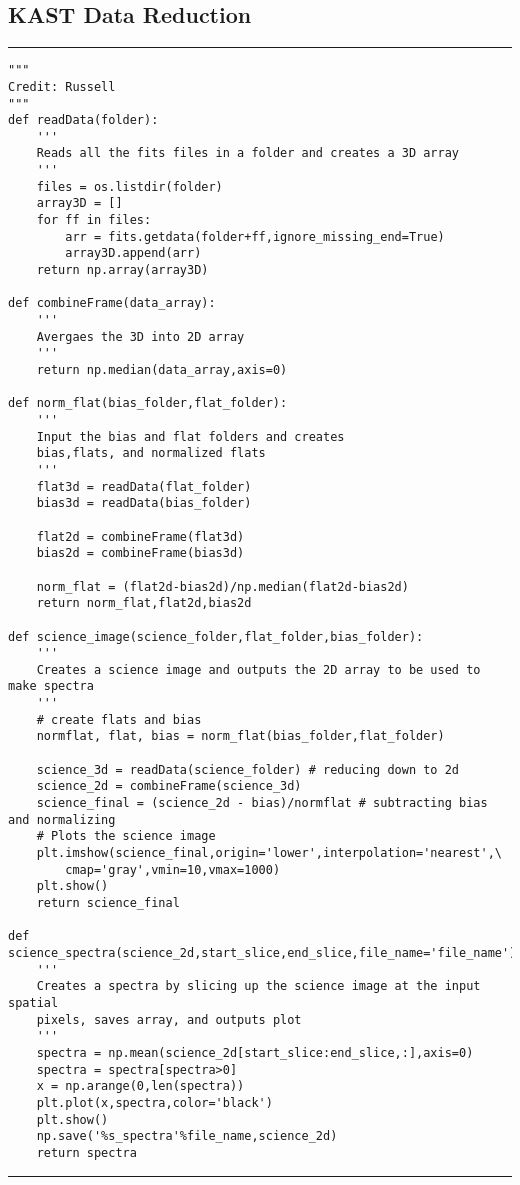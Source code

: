 \documentclass[preprint]{aastex62}
\begin{document}
\subsection{KAST Data Reduction} \label{code:reduction}
\small
\hrule
\begin{lstlisting}
"""
Credit: Russell
"""
def readData(folder):
    '''
    Reads all the fits files in a folder and creates a 3D array
    '''
    files = os.listdir(folder)
    array3D = []
    for ff in files:
        arr = fits.getdata(folder+ff,ignore_missing_end=True)
        array3D.append(arr)
    return np.array(array3D)

def combineFrame(data_array):
    '''
    Avergaes the 3D into 2D array
    '''
    return np.median(data_array,axis=0)
    
def norm_flat(bias_folder,flat_folder):
    '''
    Input the bias and flat folders and creates
    bias,flats, and normalized flats
    '''
    flat3d = readData(flat_folder)
    bias3d = readData(bias_folder)

    flat2d = combineFrame(flat3d)
    bias2d = combineFrame(bias3d)

    norm_flat = (flat2d-bias2d)/np.median(flat2d-bias2d)
    return norm_flat,flat2d,bias2d

def science_image(science_folder,flat_folder,bias_folder):
    '''
    Creates a science image and outputs the 2D array to be used to make spectra
    '''
    # create flats and bias
    normflat, flat, bias = norm_flat(bias_folder,flat_folder) 

    science_3d = readData(science_folder) # reducing down to 2d 
    science_2d = combineFrame(science_3d)
    science_final = (science_2d - bias)/normflat # subtracting bias and normalizing
    # Plots the science image
    plt.imshow(science_final,origin='lower',interpolation='nearest',\
        cmap='gray',vmin=10,vmax=1000)
    plt.show()
    return science_final

def science_spectra(science_2d,start_slice,end_slice,file_name='file_name'):
    '''
    Creates a spectra by slicing up the science image at the input spatial
    pixels, saves array, and outputs plot
    '''
    spectra = np.mean(science_2d[start_slice:end_slice,:],axis=0)
    spectra = spectra[spectra>0]
    x = np.arange(0,len(spectra))
    plt.plot(x,spectra,color='black')
    plt.show()
    np.save('%s_spectra'%file_name,science_2d)
    return spectra
\end{lstlisting}
\hrule \vspace{7pt}
\end{document}
